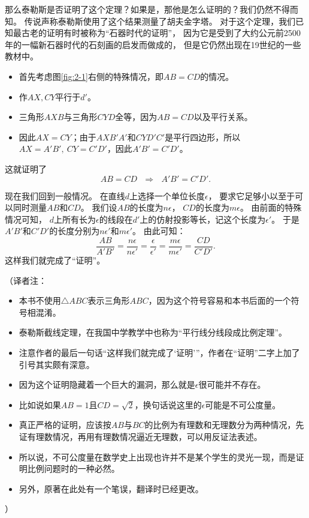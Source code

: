 \documentclass[cn,fancy,blue,11pt]{elegantbook}
\begin{document}
那么泰勒斯是否证明了这个定理？如果是，那他是怎么证明的？我们仍然不得而知。
传说声称泰勒斯使用了这个结果测量了胡夫金字塔。
对于这个定理，我们已知最古老的证明有时被称为``石器时代的证明''，
因为它是受到了大约公元前2500年的一幅新石器时代的石刻画的启发而做成的，
但是它仍然出现在19世纪的一些教材中。

\begin{itemize}
	\item 首先考虑图\ref{fig:2-1}右侧的特殊情况，即$AB=CD$的情况。
	\item 作$AX,CY$平行于$d'$。
	\item 三角形$AXB$与三角形$CYD$全等，因为$AB=CD$以及平行关系。
	\item 因此$AX=CY$；由于$AXB'A'$和$CYD'C'$是平行四边形，所以$AX=A'B',~CY=C'D'$，因此$A'B'=C'D'$。
\end{itemize}
这就证明了\[AB=CD~~~\Longrightarrow~~~A'B'=C'D'.\]

现在我们回到一般情况。
在直线$d$上选择一个单位长度$\epsilon$，
要求它足够小以至于可以同时测量$AB$和$CD$。
我们设$AB$的长度为$n\epsilon$，
$CD$的长度为$m\epsilon$。
由前面的特殊情况可知，
$d$上所有长为$\epsilon$的线段在$d'$上的仿射投影等长，记这个长度为$\epsilon'$。
于是$A'B'$和$C'D'$的长度分别为$n\epsilon'$和$m\epsilon'$。
由此可知：
\[\frac{AB}{A'B'}=\frac{n\epsilon}{n\epsilon'}=\frac{\epsilon}{\epsilon'}
=\frac{m\epsilon}{m\epsilon'}=\frac{CD}{C'D'}.\]
这样我们就完成了``证明''。

\vskip 10pt
（译者注：
\begin{itemize}
	\item 本书不使用$\triangle ABC$表示三角形$ABC$，因为这个符号容易和本书后面的一个符号相混淆。
	\item 泰勒斯截线定理，在我国中学教学中也称为``平行线分线段成比例定理''。
	\item 注意作者的最后一句话``这样我们就完成了`证明'''，作者在``证明''二字上加了引号其实颇有深意。
	\item 因为这个证明隐藏着一个巨大的漏洞，那么就是$\epsilon$很可能并不存在。
	\item 比如说如果$AB=1$且$CD=\sqrt{2}$，换句话说这里的$\epsilon$可能是不可公度量。
	\item 真正严格的证明，应该按$AB$与$BC$的比例为有理数和无理数分为两种情况，先证有理数情况，再用有理数情况逼近无理数，可以用反证法表述。
	\item 所以说，不可公度量在数学史上出现也许并不是某个学生的灵光一现，而是证明比例问题时的一种必然。
	\item 另外，原著在此处有一个笔误，翻译时已经更改。
\end{itemize}
）
\end{document}
